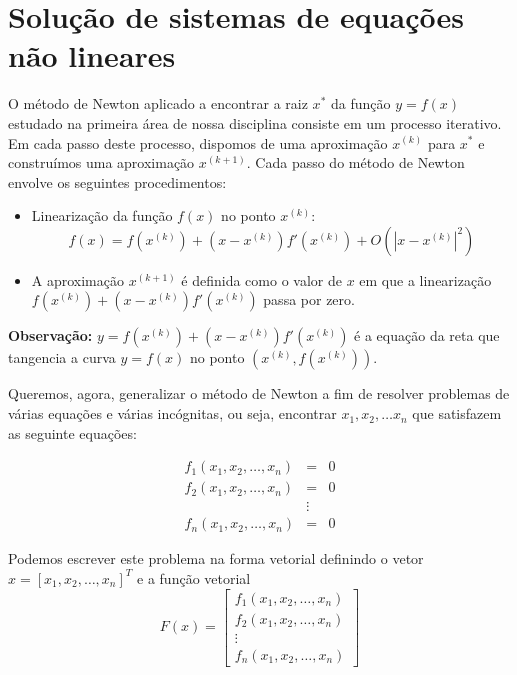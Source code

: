 \documentclass[main.tex]{subfiles}
\begin{document}
\chapter{Solução de sistemas de equações não lineares}

O método de Newton aplicado a encontrar a raiz $x^*$ da função $y=f(x)$ estudado na primeira área de nossa disciplina consiste em um processo iterativo. Em cada passo deste processo, dispomos de uma aproximação $x^{(k)}$ para $x^*$ e construímos uma aproximação $x^{(k+1)}$.  Cada passo do método de Newton envolve os seguintes procedimentos:
\begin{itemize}
\item Linearização da função $f(x)$ no ponto $x^{(k)}$: 
  \begin{equation*}
f(x)= f(x^{(k)})+ (x-x^{(k)}) f'(x^{(k)}) + O\left(|x-x^{(k)}|^2\right)    
  \end{equation*}
\item A aproximação $x^{(k+1)}$ é definida como o valor de $x$ em que a linearização $f(x^{(k)})+ (x-x^{(k)}) f'(x^{(k)})$ passa por zero.
\end{itemize}

{\bf Observação:} $y=f(x^{(k)})+ (x-x^{(k)}) f'(x^{(k)})$ é a equação da reta que tangencia a curva $y=f(x)$ no ponto $(x^{(k)},f(x^{(k)}))$.


Queremos, agora, generalizar o método de Newton a fim de resolver problemas de várias equações e várias incógnitas, ou seja, encontrar $x_1,x_2,\ldots x_n$ que satisfazem as seguinte equações:

\begin{eqnarray*}
f_1(x_1,x_2,\ldots,x_n)&=&0\\
f_2(x_1,x_2,\ldots,x_n)&=&0\\
&\vdots&\\
f_n(x_1,x_2,\ldots,x_n)&=&0
\end{eqnarray*}

Podemos escrever este problema na forma vetorial definindo o vetor $x=[x_1,x_2,\ldots,x_n]^T$ e a função vetorial
$$F(x)=\left[
\begin{array}{c}
f_1(x_1,x_2,\ldots,x_n)\\
f_2(x_1,x_2,\ldots,x_n)\\
\vdots\\
f_n(x_1,x_2,\ldots,x_n)
\end{array}
\right]$$
\end{document}
